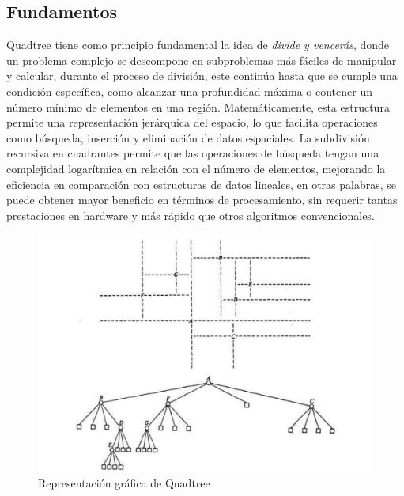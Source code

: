 \documentclass[9pt,a4paper,twoside]{rho-class/rho}
\begin{document}
        \subsection{Fundamentos}
            Quadtree tiene como principio fundamental la idea de \textit{divide y vencerás}, donde un problema complejo se descompone en subproblemas más fáciles de manipular y calcular, durante el proceso de división, este continúa hasta que se cumple una condición específica, como alcanzar una profundidad máxima o contener un número mínimo de elementos en una región.
            Matemáticamente, esta estructura permite una representación jerárquica del espacio, lo que facilita operaciones como búsqueda, inserción y eliminación de datos espaciales. La subdivisión recursiva en cuadrantes permite que las operaciones de búsqueda tengan una complejidad logarítmica en relación con el número de elementos, mejorando la eficiencia en comparación con estructuras de datos lineales, en otras palabras, se puede obtener mayor beneficio en términos de procesamiento, sin requerir tantas prestaciones en hardware y más rápido que otros algoritmos convencionales. \cite{samet_quadtree}
            \begin{figure}[h]
                \centering
                \includegraphics[width=\linewidth]{figures/quad-tree.pdf}
                \caption{Representación gráfica de Quadtree \cite{finkel_bentley_quadtree}}
                \label{fig:representation_figure}
            \end{figure}\\
\end{document}
